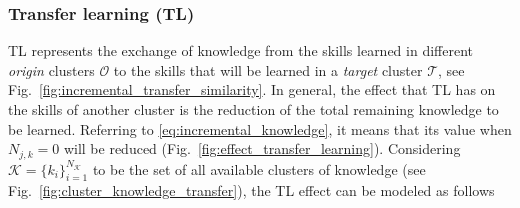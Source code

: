 \subsubsection{\textbf{Transfer learning (TL)}}

TL represents the exchange of knowledge from the skills learned in different \emph{origin} clusters $\mathcal{O}$ to the skills that will be learned in a \emph{target} cluster $\mathcal{T}$, see Fig.~\ref{fig:incremental_transfer_similarity}. In general, the effect that TL has on the skills of another cluster is the reduction of the total remaining knowledge to be learned. Referring to \eqref{eq:incremental_knowledge}, it means that its value when $N_{j,k} = 0$ will be reduced (Fig.~\ref{fig:effect_transfer_learning}). Considering $\mathcal{K} = \{ k_i \}^{N_\mathcal{K}}_{i=1}$ to be the set of all available clusters of knowledge (see Fig.~\ref{fig:cluster_knowledge_transfer}), the TL effect can be modeled as follows



